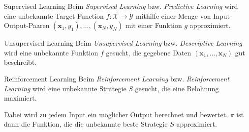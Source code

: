 \begin{defi}{Supervised Learning}
    Beim \emph{Supervised Learning} bzw. \emph{Predictive Learning} wird eine unbekannte Target Function $f: \mathcal{X} \to \mathcal{Y}$ mithilfe einer Menge von Input-Output-Paaren $(\mathbf{x}_1, y_1), \ldots, (\mathbf{x}_N, y_N)$ mit einer Funktion $g$ approximiert.
\end{defi}

\begin{defi}{Unsupervised Learning}
    Beim \emph{Unsupervised Learning} bzw. \emph{Descriptive Learning} wird eine unbekannte Funktion $f$ gesucht, die gegebene Daten $(\mathbf{x}_1, \ldots, \mathbf{x}_N)$ gut beschreibt.
\end{defi}

\begin{defi}{Reinforcement Learning}
    Beim \emph{Reinforcement Learning} bzw. \emph{Reinforcement Learning} wird eine unbekannte Strategie $S$ gesucht, die eine Belohnung maximiert.

    Dabei wird zu jedem Input ein möglicher Output berechnet und bewertet.
    $\pi$ ist dann die Funktion, die die unbekannte beste Strategie $S$ approximiert.
\end{defi}

